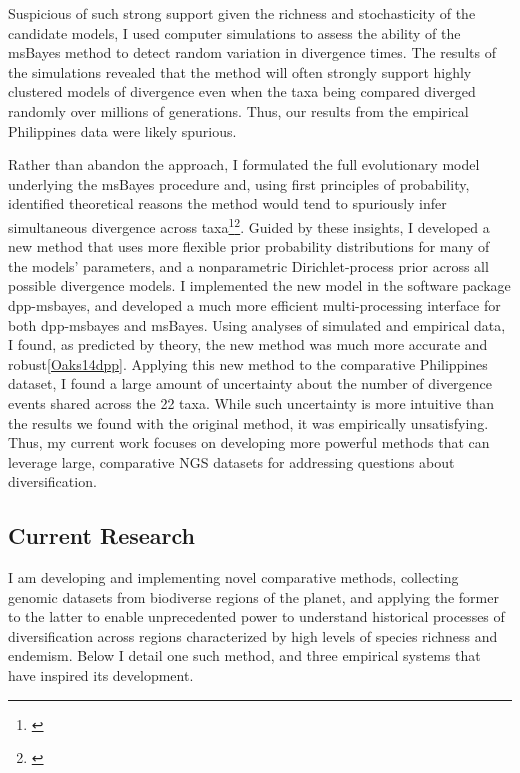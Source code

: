 Suspicious of such strong support given the richness and stochasticity of the
candidate models,
I used computer simulations to assess the ability of the msBayes method to
detect random variation in divergence times.
The results of the simulations revealed that the method will often strongly
support highly clustered models of divergence even when the taxa being compared
diverged randomly over millions of generations.
Thus, our results from the empirical Philippines data were likely spurious.

Rather than abandon the approach, I formulated the full evolutionary model
underlying the msBayes procedure and, using first 
principles of probability, identified theoretical reasons the method
would tend to spuriously infer simultaneous divergence across
taxa\footnote{\label{Oaks12}}\super{,}\footnote{\label{Oaks14reply}}.
Guided by these insights, I developed a new method that uses more flexible
prior probability distributions for many of the models' parameters, and a
nonparametric Dirichlet-process prior across all possible divergence models.
I implemented the new model in the software package dpp-msbayes, and developed
a much more efficient multi-processing interface for both dpp-msbayes and
msBayes.
Using analyses of simulated and empirical data, I found, as predicted by
theory, the new method was much more accurate and robust\cref{Oaks14dpp}.
Applying this new method to the comparative Philippines dataset, I found a
large amount of uncertainty about the number of divergence events shared across
the 22 taxa.
While such uncertainty is more intuitive than the results we found with the
original method, it was empirically unsatisfying.
Thus, my current work focuses on developing more powerful methods that can
leverage large, comparative NGS datasets for addressing questions about
diversification.


\subsection*{Current Research}
I am developing and implementing novel comparative methods, collecting genomic
datasets from biodiverse regions of the planet, and applying the former to the
latter to enable unprecedented power to understand historical processes of
diversification across regions characterized by high levels of species richness
and endemism.  Below I detail one such method, and three empirical systems that
have inspired its development.

